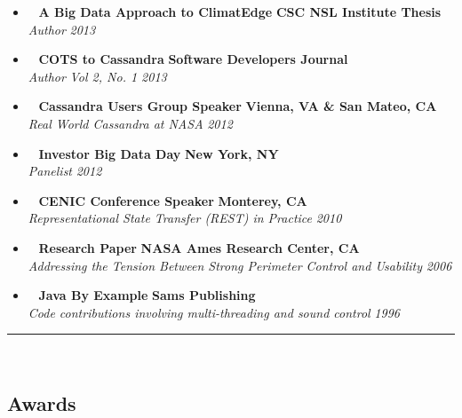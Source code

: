 \begin{itemize}
    \parskip=0.1em
    \item\ 
    \headerrow
        {\textbf{A Big Data Approach to ClimatEdge\texttrademark}}
        {\textbf{CSC NSL Institute Thesis}}
    \\
    \headerrow
        {\emph{Author}}
        {\emph{2013}}
    \item\ 
	\headerrow
		{\textbf{COTS to Cassandra}}
		{\textbf{Software Developers Journal}}
	\\
	\headerrow
		{\emph{Author}}
		{\emph{Vol 2, No. 1 2013}}
    \item\ 
	\headerrow
		{\textbf{Cassandra Users Group Speaker}}
		{\textbf{Vienna, VA \& San Mateo, CA}}
	\\
	\headerrow
		{\emph{Real World Cassandra at NASA}}
		{\emph{2012}}
	\item\
	\headerrow
		{\textbf{Investor Big Data Day}}
		{\textbf{New York, NY}}
	\\
	\headerrow
		{\emph{Panelist}}
		{\emph{2012}} 
	\item\
    \headerrow
		{\textbf{CENIC Conference Speaker}}
		{\textbf{Monterey, CA}}
	\\
	\headerrow
		{\emph{Representational State Transfer (REST) in Practice}}
		{\emph{2010}}
	\item\ 
	\headerrow
		{\textbf{Research Paper}}
		{\textbf{NASA Ames Research Center, CA}}
	\\
	\headerrow
		{\emph{Addressing the Tension Between Strong Perimeter Control and Usability}}
		{\emph{2006}}
	\item\ 
	\headerrow
		{\textbf{Java By Example}}
		{\textbf{Sams Publishing}}
	\\
	\headerrow
		{\emph{Code contributions involving multi-threading and sound control}}
		{\emph{1996}}
\end{itemize}


\hrule\
\vspace{-0.4em}
\subsection*{Awards}

